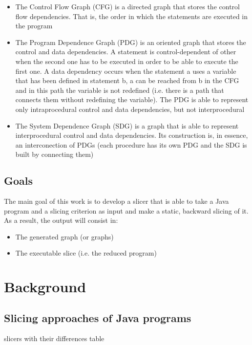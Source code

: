 \documentclass[a4paper]{article}
\begin{document}
\begin{itemize}
\item The Control Flow Graph (CFG) is a directed graph that stores the control flow dependencies. That is, the order in which the statements are executed in the program
\item The Program Dependence Graph (PDG) is an oriented graph that stores the control and data dependencies. A statement is control-dependent of other when the second one has to be executed in order to be able to execute the first one. A data dependency occurs when the statement a uses a variable that has been defined in statement b, a can be reached from b in the CFG and in this path the variable is not redefined (i.e. there is a path that connects them without redefining the variable). The PDG is able to represent only intraprocedural control and data dependencies, but not interprocedural
\item The System Dependence Graph (SDG) is a graph that is able to represent interprocedural control and data dependencies. Its construction is, in essence, an interconection of PDGs (each procedure has its own PDG and the SDG is built by connecting them)

\end{itemize}

\subsection{Goals}

The main goal of this work is to develop a slicer that is able to take a Java program and a slicing criterion as input and make a static, backward slicing of it. As a result, the output will consist in:

\begin{itemize}
  \item The generated graph (or graphs)
  \item The executable slice (i.e. the reduced program)
\end{itemize}

\section{Background}

\subsection{Slicing approaches of Java programs}

slicers with their differences table
\end{document}
